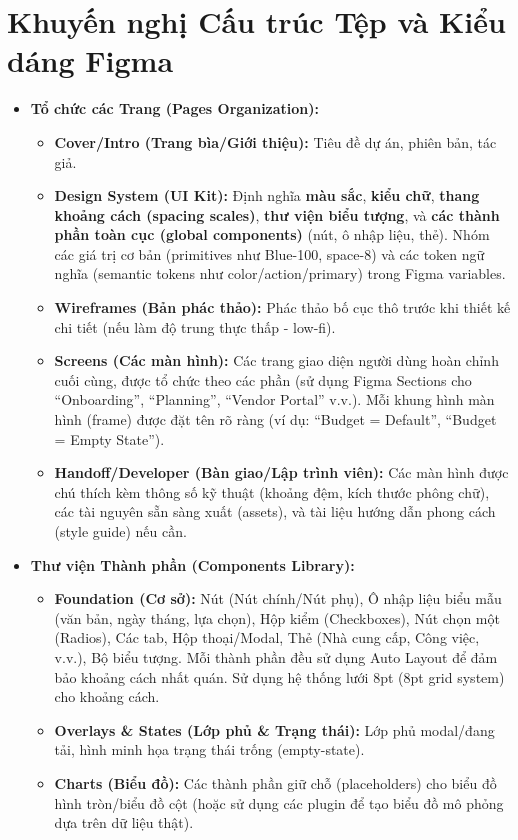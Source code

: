 \documentclass[11pt,a4paper]{article}
\begin{document}
\section{Khuyến nghị Cấu trúc Tệp và Kiểu dáng Figma}

\begin{itemize}
    \item \textbf{Tổ chức các Trang (Pages Organization):}
    \begin{itemize}
        \item \textbf{Cover/Intro (Trang bìa/Giới thiệu):} Tiêu đề dự án, phiên bản, tác giả.
        \item \textbf{Design System (UI Kit):} Định nghĩa \textbf{màu sắc}, \textbf{kiểu chữ}, \textbf{thang khoảng cách (spacing scales)}, \textbf{thư viện biểu tượng}, và \textbf{các thành phần toàn cục (global components)} (nút, ô nhập liệu, thẻ). Nhóm các giá trị cơ bản (primitives như Blue-100, space-8) và các token ngữ nghĩa (semantic tokens như color/action/primary) trong Figma variables.
        \item \textbf{Wireframes (Bản phác thảo):} Phác thảo bố cục thô trước khi thiết kế chi tiết (nếu làm độ trung thực thấp - low-fi).
        \item \textbf{Screens (Các màn hình):} Các trang giao diện người dùng hoàn chỉnh cuối cùng, được tổ chức theo các phần (sử dụng Figma Sections cho ``Onboarding'', ``Planning'', ``Vendor Portal'' v.v.). Mỗi khung hình màn hình (frame) được đặt tên rõ ràng (ví dụ: ``Budget = Default'', ``Budget = Empty State'').
        \item \textbf{Handoff/Developer (Bàn giao/Lập trình viên):} Các màn hình được chú thích kèm thông số kỹ thuật (khoảng đệm, kích thước phông chữ), các tài nguyên sẵn sàng xuất (assets), và tài liệu hướng dẫn phong cách (style guide) nếu cần.
    \end{itemize}
    
    \item \textbf{Thư viện Thành phần (Components Library):}
    \begin{itemize}
        \item \textbf{Foundation (Cơ sở):} Nút (Nút chính/Nút phụ), Ô nhập liệu biểu mẫu (văn bản, ngày tháng, lựa chọn), Hộp kiểm (Checkboxes), Nút chọn một (Radios), Các tab, Hộp thoại/Modal, Thẻ (Nhà cung cấp, Công việc, v.v.), Bộ biểu tượng. Mỗi thành phần đều sử dụng Auto Layout để đảm bảo khoảng cách nhất quán. Sử dụng hệ thống lưới 8pt (8pt grid system) cho khoảng cách.
        \item \textbf{Overlays \& States (Lớp phủ \& Trạng thái):} Lớp phủ modal/đang tải, hình minh họa trạng thái trống (empty-state).
        \item \textbf{Charts (Biểu đồ):} Các thành phần giữ chỗ (placeholders) cho biểu đồ hình tròn/biểu đồ cột (hoặc sử dụng các plugin để tạo biểu đồ mô phỏng dựa trên dữ liệu thật).
    \end{itemize}
    

\end{itemize}
\end{document}
